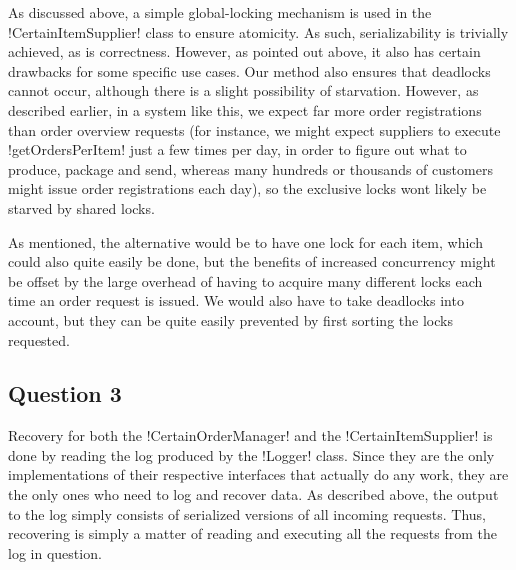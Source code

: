 \documentclass[a4paper, 12pt]{article}
\begin{document}



As discussed above, a simple global-locking mechanism is used in the
!CertainItemSupplier! class to ensure atomicity. As such,
serializability is trivially achieved, as is correctness. However, as
pointed out above, it also has certain drawbacks for some specific use
cases. Our method also ensures that deadlocks cannot occur, although
there is a slight possibility of starvation. However, as described
earlier, in a system like this, we expect far more order registrations
than order overview requests (for instance, we might expect suppliers
to execute !getOrdersPerItem! just a few times per day, in order to
figure out what to produce, package and send, whereas many hundreds or
thousands of customers might issue order registrations each day), so
the exclusive locks wont likely be starved by shared locks.

As mentioned, the alternative would be to have one lock for each item,
which could also quite easily be done, but the benefits of increased
concurrency might be offset by the large overhead of having to acquire
many different locks each time an order request is
issued. We would also have to take deadlocks into account, but they
can be quite easily prevented by first sorting the locks requested.

\subsection*{Question 3}


Recovery for both the !CertainOrderManager! and the
!CertainItemSupplier! is done by reading the log produced by the
!Logger! class. Since they are the only implementations of their
respective interfaces that actually do any work, they are the only
ones who need to log and recover data. As described above, the output
to the log simply consists of serialized versions of all incoming
requests. Thus, recovering is simply a matter of reading and executing
all the requests from the log in question.
\end{document}
